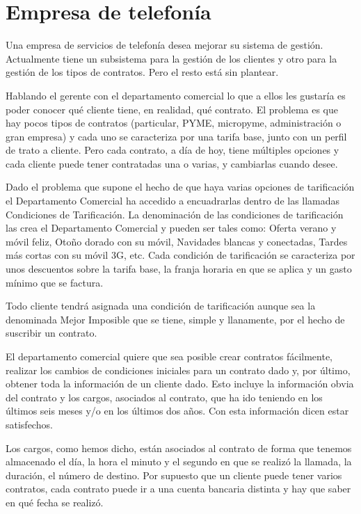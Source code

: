 \documentclass{db-practice}
\begin{document}
\section{Empresa de telefonía}
Una empresa de servicios de telefonía desea mejorar su sistema de gestión. Actualmente tiene un subsistema para la gestión de los clientes y otro para la gestión de los tipos de contratos. Pero el resto está sin plantear. 

Hablando el gerente con el departamento comercial lo que a ellos les gustaría es poder conocer qué cliente tiene, en realidad, qué contrato. El problema es que hay pocos tipos de contratos (particular, PYME, micropyme, administración o gran empresa) y cada uno se caracteriza por una tarifa base, junto con un perfil de trato a cliente. Pero cada contrato, a día de hoy, tiene múltiples opciones y cada cliente puede tener contratadas una o varias, y cambiarlas cuando desee. 

Dado el problema que supone el hecho de que haya varias opciones de tarificación el Departamento Comercial ha accedido a encuadrarlas dentro de las llamadas Condiciones de Tarificación. La denominación de las condiciones de tarificación las crea el Departamento Comercial y pueden ser tales como: Oferta verano y móvil feliz, Otoño dorado con su móvil, Navidades blancas y conectadas, Tardes más cortas con su móvil 3G, etc. Cada condición de tarificación se caracteriza por unos descuentos sobre la tarifa base, la franja horaria en que se aplica y un gasto mínimo que se factura. 

Todo cliente tendrá asignada una condición de tarificación aunque sea la denominada Mejor Imposible que se tiene, simple y llanamente, por el hecho de suscribir un contrato.

El departamento comercial quiere que sea posible crear contratos fácilmente, realizar los cambios de condiciones iniciales para un contrato dado y, por último, obtener toda la información de un cliente dado. Esto incluye la información obvia del contrato y los cargos, asociados al contrato, que ha ido teniendo en los últimos seis meses y/o en los últimos dos años. Con esta información dicen estar satisfechos. 

Los cargos, como hemos dicho, están asociados al contrato de forma que tenemos almacenado el día, la hora el minuto y el segundo en que se realizó la llamada, la duración, el número de destino. Por supuesto que un cliente puede tener varios contratos, cada contrato puede ir a una cuenta bancaria distinta y hay que
saber en qué fecha se realizó.
\end{document}
